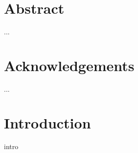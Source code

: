 \documentclass{report}
\begin{document}
\maketitle



%


\chapter*{Abstract}%
%
...
\chapter*{Acknowledgements}%
%
...


\tableofcontents





\chapter{Introduction}
intro
\end{document}
